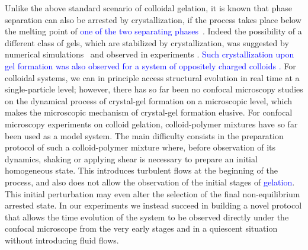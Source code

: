 \documentclass[preprint,amsmath,amssymb,superscriptaddress]{revtex4-1}
\begin{document}
Unlike the above standard scenario of colloidal gelation, it is known that phase separation can also be arrested by crystallization, if the process takes place below the melting point of \textcolor{blue}{one of the two separating phases}~\cite{tanaka1985new}. Indeed the possibility of a different class of gels, which are stabilized by crystallization, 
was suggested by numerical simulations~\cite{soga1999metastable,fortini2008crystallization,perez2011pathways} and observed in experiments \cite{sabin2012,zhang2012non}. \textcolor{blue}{Such crystallization upon gel formation was also observed 
for a system of oppositely charged colloids \cite{sanz2008gel,sanz2008out}.}  
For colloidal systems, we can in principle access structural evolution in real time at a single-particle level; however, there has so far been no confocal microscopy  
studies on the dynamical process of crystal-gel formation on a microscopic level, which makes the microscopic mechanism of crystal-gel formation elusive. 
For confocal microscopy experiments on colloid gelation, colloid-polymer mixtures have so far been used as a model system. 
The main difficulty consists in the preparation protocol of such a colloid-polymer mixture where, before observation of its dynamics, shaking or applying shear is necessary to prepare an initial homogeneous state. This introduces turbulent flows at the beginning of the process, and also does not allow the
observation of the initial stages of  \textcolor{blue}{gelation}. This initial perturbation may even alter the selection of the final non-equilibrium arrested state.  
In our experiments we instead succeed in building a novel protocol that allows the time evolution of the system to be observed directly
under the confocal microscope from the very early stages and in a quiescent situation without introducing fluid flows. 
\end{document}
